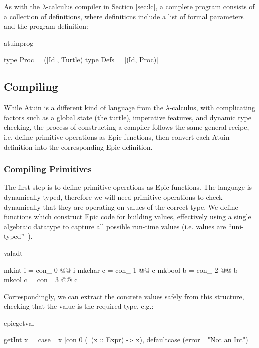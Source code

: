 \noindent
As with the $\lambda$-calculus compiler in Section \ref{sec:lc}, a
complete program consists of a collection of definitions,
where definitions include a list of formal parameters and the
program definition:

\begin{SaveVerbatim}{atuinprog}

type Proc = ([Id], Turtle)
type Defs = [(Id,  Proc)]

\end{SaveVerbatim}

\subsection{Compiling}

While Atuin is a different kind of language from the
$\lambda$-calculus, with complicating factors such as a global state
(the turtle), imperative features, and dynamic type checking, the
process of constructing a compiler follows the same general recipe, i.e.
define primitive operations as Epic functions, then convert each Atuin
definition into the corresponding Epic definition.

\subsubsection{Compiling Primitives}

The first step is to define primitive operations as Epic functions.
The language is dynamically typed, therefore we will need primitive
operations to check dynamically that they are operating on values of
the correct type. We define functions which construct Epic code for
building values, effectively using a single algebraic datatype to
capture all possible run-time values (i.e. values are
``uni-typed''~\cite{wadlerblame}).

\begin{SaveVerbatim}{valadt}

mkint  i = con_ 0 @@ i
mkchar c = con_ 1 @@ c
mkbool b = con_ 2 @@ b
mkcol  c = con_ 3 @@ c

\end{SaveVerbatim}

\noindent
Correspondingly, we can extract the concrete values safely from this
structure, checking that the value is the required type, e.g.:

\begin{SaveVerbatim}{epicgetval}

getInt x  = case_ x [con 0 (\ (x :: Expr) -> x), 
                     defaultcase (error_ "Not an Int")]

\end{SaveVerbatim}

